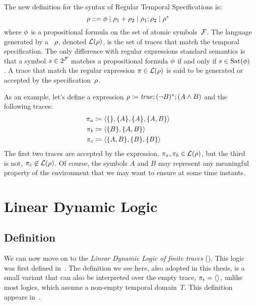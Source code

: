 The new definition for the syntax of Regular Temporal Specifications \re{} is:
\begin{equation}
	\rho ::= \phi \mid
	\rho_1 + \rho_2 \mid \rho_1 ; \rho_2 \mid \rho^*
	\label{eq:re}
\end{equation}
where $\phi$ is a propositional formula on the set of atomic
symbols~$\mathcal{F}$. The language generated by a \re{}~$\rho$, denoted
$\mathcal{L}(\rho)$, is the set of traces that match the temporal
specification. The only difference with regular expressions standard
semantics is that a symbol $s \in 2^{\mathcal{F}}$ matches a propositional formula
$\phi$ if and only if $s \in \text{Sat}(\phi)$. A trace that
match the regular expression $\pi \in \mathcal{L}(\rho)$ is said to be
generated or accepted by the specification~$\rho$.

\begin{example}
	As an example, let's define a \re{} expression $\rho \coloneqq \text{\textit{true}};
	(\neg B)^*; (A \land B)$ and the following traces:
	\begin{align*}
		\pi_a &\coloneqq \langle \{\}, \{A\}, \{A\}, \{A,B\} \rangle \\
		\pi_b &\coloneqq \langle \{B\}, \{A,B\} \rangle \\
		\pi_c &\coloneqq \langle \{A, B\}, \{B\}, \{B\} \rangle \\
	\end{align*}
	The first two traces are accepted by the expression, $\pi_a, \pi_b \in
	\mathcal{L}(\rho)$, but the third is not, $\pi_c \not\in
	\mathcal{L}(\rho)$. Of course, the symbols $A$ and $B$ may represent any
	meaningful property of the environment that we may want to ensure
	at some time instants.
\end{example}


\section{Linear Dynamic Logic}
\label{sec:ldlf}

\subsection{Definition}

We can now move on to the \emph{Linear Dynamic Logic of finite traces}
(\ldl{}).
This logic was first defined in~\cite{bib:ltlf-ldlf}. The definition we see
here, also adopted in this thesis, is a small variant that can also be
interpreted over the empty trace, $\pi_\epsilon = \langle \rangle$, unlike
most logics, which assume a non-empty temporal domain~$T$.  This definition
appears in~\cite{bib:degiacomo-logic-nmrdp}.

